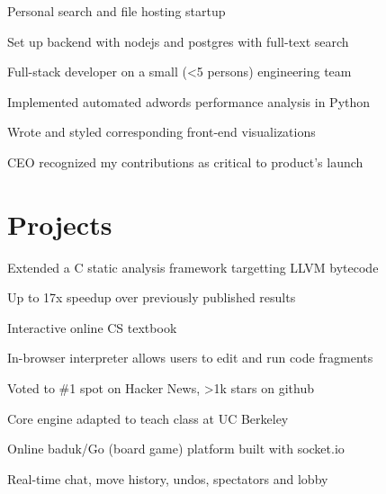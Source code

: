 \documentclass[]{deedy-resume-openfont}
\begin{document}
\begin{minipage}[t]{0.66\textwidth}
\begin{tightemize}
\item Personal search and file hosting startup
\item Set up backend with nodejs and postgres with full-text search
\end{tightemize}
\sectionsep

\begin{tightemize}
\item Full-stack developer on a small (<5 persons) engineering team 
\item Implemented automated adwords performance analysis in Python
\item Wrote and styled corresponding front-end visualizations
\item CEO recognized my contributions as critical to product's launch
\end{tightemize}
\sectionsep


\section{Projects}

\hfill {} \descript{}
\begin{tightemize}
\item Extended a C static analysis framework targetting LLVM bytecode
\item Up to 17x speedup over previously published results
\end{tightemize}
\sectionsep

\hfill {} \descript{}
\begin{tightemize}
\item Interactive online CS textbook
\item In-browser interpreter allows users to edit and run code fragments
\item Voted to \#1 spot on Hacker News, >1k stars on github
\item Core engine adapted to teach class at UC Berkeley
\end{tightemize}
\sectionsep

\hfill {} \descript{}
\begin{tightemize}
\item Online baduk/Go (board game) platform built with socket.io
\item Real-time chat, move history, undos, spectators and lobby
\end{tightemize}
\sectionsep

\end{minipage} 
\end{document}
